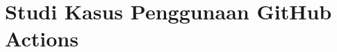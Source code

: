 \documentclass[aspectratio=169, table]{beamer}
\begin{document}
%
%	
%			
%		
%			

\section{Studi Kasus Penggunaan GitHub Actions}
\end{document}
